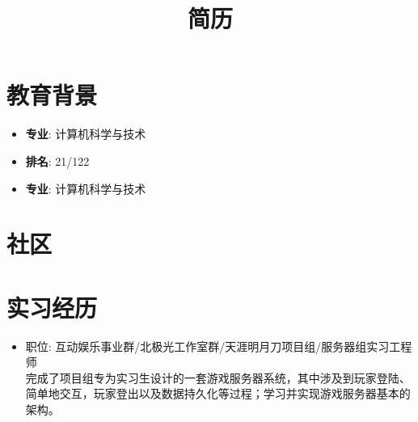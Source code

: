 \documentclass[11pt,a4paper]{moderncv}
\title{简历}               %
\begin{document}
\maketitle

\section{教育背景}
{
\begin{itemize}
\item \textbf{专业}: 计算机科学与技术
\item \textbf{排名}: 21/122
\end{itemize}
}


{
\begin{itemize}
\item \textbf{专业}: 计算机科学与技术
\end{itemize}
}


\section{社区}


\section{实习经历}
{
\begin{itemize}
\item 职位: 互动娱乐事业群/北极光工作室群/天涯明月刀项目组/服务器组实习工程师\\
完成了项目组专为实习生设计的一套游戏服务器系统，其中涉及到玩家登陆、简单地交互，玩家登出以及数据持久化等过程；学习并实现游戏服务器基本的架构。
\end{itemize}
}
\end{document}
